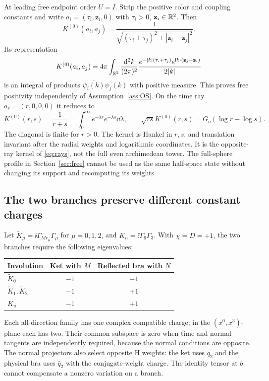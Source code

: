 At leading free endpoint order $U=I$. Strip the positive color and
coupling constants and write $a_i=(\tau_i,\mathbf z_i,0)$ with
$\tau_i>0$, $\mathbf z_i\in\mathbb R^2$. Then
\begin{equation}\label{eq:free-OS}
 K^{(0)}(a_i,a_j)=
 \frac1{\sqrt{(\tau_i+\tau_j)^2+|\mathbf z_i-\mathbf z_j|^2}}.
\end{equation}
Its representation
\begin{equation}
 K^{(0)}(a_i,a_j)=4\pi\int_{\mathbb R^2}\frac{\mathrm d^2k}{(2\pi)^2}
 \frac{e^{-|k|(\tau_i+\tau_j)}
 e^{\mathrm i k\cdot(\mathbf z_j-\mathbf z_i)}}{2|k|}
\end{equation}
is an integral of products $\overline{\psi_i(k)}\psi_j(k)$ with
positive measure. This proves free positivity independently of
Assumption~\ref{ass:OS}. On the time ray $a_r=(r,0,0,0)$ it reduces to
\begin{equation}\label{eq:opposite-ray}
 K^{(0)}(r,s)=\frac1{r+s}
 =\int_0^\infty e^{-\lambda r}e^{-\lambda s}\dd\lambda,
 \qquad
 \sqrt{rs}K^{(0)}(r,s)=G_o(\log r-\log s).
\end{equation}
The diagonal is finite for $r>0$. The kernel is Hankel in $r,s$,
and translation invariant after the radial weights and logarithmic
coordinates. It is the opposite-ray kernel of \eqref{eq:rays}, not
the full even archimedean tower. The full-sphere profile in
Section~\ref{sec:free} cannot be used as the same half-space state
without changing its support and recomputing its weights.

\subsection{The two branches preserve different constant charges}

Let $\widetilde K_\mu=\ii\Gamma_{Me_\mu}\Gamma_\mu$ for
$\mu=0,1,2$, and $K_n=\ii\Gamma_6\Gamma_3$. With $\chi=D=+1$,
the two branches require the following eigenvalues:
\begin{center}
\begin{tabular}{lcc}
\toprule
Involution & Ket with $M$ & Reflected bra with $N$\\
\midrule
$\widetilde K_0$ & $-1$ & $-1$\\
$\widetilde K_1,\widetilde K_2$ & $-1$ & $+1$\\
$K_n$ & $-1$ & $+1$\\
\bottomrule
\end{tabular}
\end{center}
Each all-direction family has one complex compatible charge; in
the $(x^0,x^3)$-plane each has two. Their common subspace is zero
when time and normal tangents are independently required, because
the normal conditions are opposite. The normal projectors also
select opposite H weights: the ket uses $q_2$ and the physical bra
uses $\bar q_2$ with the conjugate-weight charge. The identity tensor
at $b$ cannot compensate a nonzero variation on a branch.

